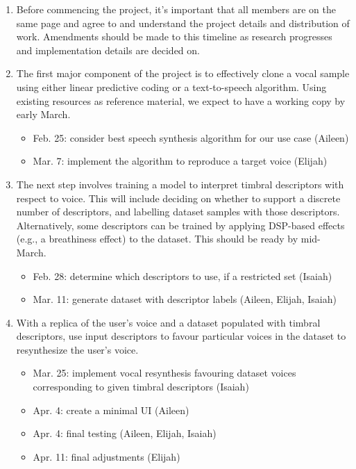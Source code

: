 \documentclass{article}
\begin{document}
\begin{enumerate}
  \item Before commencing the project, it’s important that all members are on the same page and agree to and understand the project details and distribution of work. Amendments should be made to this timeline as research progresses and implementation details are decided on.
  \item The first major component of the project is to effectively clone a vocal sample using either linear predictive coding or a text-to-speech algorithm. Using existing resources as reference material, we expect to have a working copy by early March.
    \begin{itemize}
      \item Feb. 25: consider best speech synthesis algorithm for our use case (Aileen)
      \item Mar. 7: implement the algorithm to reproduce a target voice (Elijah)
    \end{itemize}
  \item The next step involves training a model to interpret timbral descriptors with respect to voice. This will include deciding on whether to support a discrete number of descriptors, and labelling dataset samples with those descriptors. Alternatively, some descriptors can be trained by applying DSP-based effects (e.g., a breathiness effect) to the dataset. This should be ready by mid-March.
    \begin{itemize}
      \item Feb. 28: determine which descriptors to use, if a restricted set (Isaiah)
      \item Mar. 11: generate dataset with descriptor labels (Aileen, Elijah, Isaiah)
    \end{itemize}
  \item With a replica of the user’s voice and a dataset populated with timbral descriptors, use input descriptors to favour particular voices in the dataset to resynthesize the user’s voice.
    \begin{itemize}
      \item Mar. 25: implement vocal resynthesis favouring dataset voices corresponding to given timbral descriptors (Isaiah)
      \item Apr. 4: create a minimal UI (Aileen)
      \item Apr. 4: final testing (Aileen, Elijah, Isaiah)
      \item Apr. 11: final adjustments (Elijah)
    \end{itemize}
\end{enumerate}
\end{document}

